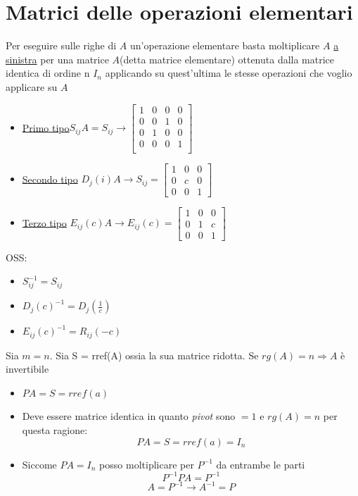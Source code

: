\documentclass[12pt,a4paper,oneside]{article}
\begin{document}
\section{Matrici delle operazioni elementari}
Per eseguire sulle righe di $A$ un'operazione elementare basta moltiplicare $A$ \underline{a sinistra} per una matrice $A$(detta matrice elementare) ottenuta dalla matrice identica di ordine n $I_n$ applicando su quest'ultima le stesse operazioni che voglio applicare su $A$
\begin{itemize}
	\item \underline{Primo tipo}$S_{ij}A = S_{ij} \rightarrow
		      \begin{bmatrix}
			      1 & 0 & 0 & 0 \\
			      0 & 0 & 1 & 0 \\
			      0 & 1 & 0 & 0 \\
			      0 & 0 & 0 & 1 \\
		      \end{bmatrix} $
	\item \underline{Secondo tipo} $D_j\left( i \right) A \rightarrow S_{ij}=
		      \begin{bmatrix}
			      1 & 0 & 0 \\
			      0 & c & 0 \\
			      0 & 0 & 1
		      \end{bmatrix} $
	\item \underline{Terzo tipo} $E_{ij}\left( c \right) A \rightarrow E_{ij}\left( c \right) =
		      \begin{bmatrix}
			      1 & 0 & 0 \\
			      0 & 1 & c \\
			      0 & 0 & 1
		      \end{bmatrix} $
\end{itemize}
OSS:
\begin{itemize}
	\item $S_{ij}^{-1}= S_{ij}$
	\item $D_j\left( c \right) ^{-1}= D_j\left( \frac{1}{c} \right) $
	\item  $E_{ij}\left( c \right) ^{-1}=R_{ij}\left( -c \right) $
\end{itemize}
Sia $m=n$. Sia S = rref(A) ossia la sua matrice ridotta. Se $rg\left( A \right) = n \Rightarrow A $ è invertibile
\begin{itemize}
	\item $PA=S=rref\left( a \right) $
	\item Deve essere matrice identica in quanto \textit{pivot} sono $=1$ e $rg\left( A \right) =n$ per questa ragione:
	      \[
		      PA=S=rref\left( a \right) =I_n
	      \]
	\item Siccome $PA=I_n$ posso moltiplicare per $P^{-1}$ da entrambe le parti
	      \[
		      P^{-1}PA=P^{-1}
	      \]
	      \[
		      A=P^{-1} \rightarrow A^{-1}=P
	      \]
\end{itemize}
\end{document}
